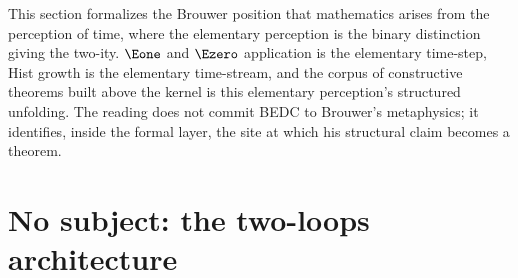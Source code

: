 \begin{remark}[Reading]
\label{rem:brouwer-time}
This section formalizes the Brouwer position that mathematics arises from the perception of time, where the elementary perception is the binary distinction giving the two-ity. \(\Eone\) and \(\Ezero\) application is the elementary time-step, Hist growth is the elementary time-stream, and the corpus of constructive theorems built above the kernel is this elementary perception's structured unfolding. The reading does not commit BEDC to Brouwer's metaphysics; it identifies, inside the formal layer, the site at which his structural claim becomes a theorem.
\end{remark}

\section{No subject: the two-loops architecture}
\label{sec:observer-two-loops-no-subject}

